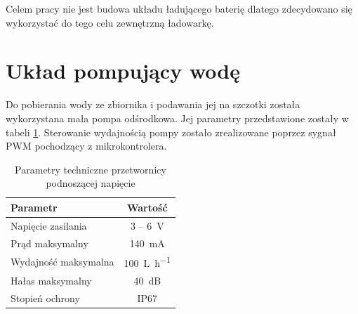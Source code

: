 		Celem pracy nie jest budowa układu ładującego baterię dlatego zdecydowano się wykorzystać do tego celu zewnętrzną ładowarkę.
		

	
	\section{Układ pompujący wodę}
	    Do pobierania wody ze zbiornika i podawania jej na szczotki została wykorzystana mała pompa odśrodkowa. Jej parametry przedstawione zostały w tabeli \ref{tab:pompa}. Sterowanie wydajnością pompy zostało zrealizowane poprzez sygnał PWM pochodzący z mikrokontrolera.
	    
	    \begin{table}[ht]
			\centering
			\begin{tabular}{|l|c|} \hline
				\textbf{Parametr} & \textbf{Wartość} \\
				\hline
				\hline Napięcie zasilania & 3 -- \SI{6}{\volt} \\
				\hline Prąd maksymalny & \SI{140}{\mA} \\
				\hline 	Wydajność maksymalna & \SI[per-mode=symbol]{100}{\liter\per\hour} \\
				\hline 	Hałas maksymalny & \SI{40}{\dB} \\
				\hline 	Stopień ochrony & IP67  \\
				\hline
			\end{tabular}
			\caption{Parametry techniczne przetwornicy podnoszącej napięcie}
			\label{tab:pompa}
		\end{table}
	
